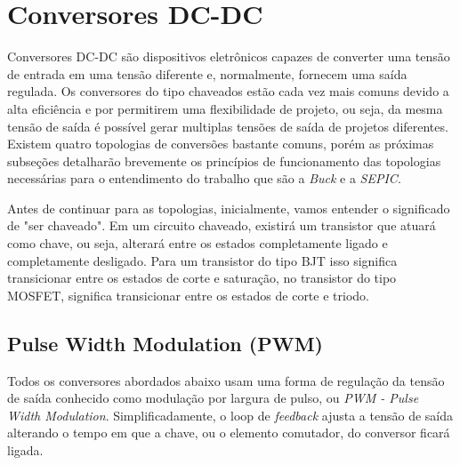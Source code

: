 \section{Conversores DC-DC}\label{converters_revision}
Conversores DC-DC \cite{ti_whitepaper}\cite{power_electronics_hart} são dispositivos eletrônicos capazes de converter uma tensão de entrada em uma tensão diferente e, normalmente, fornecem uma saída regulada. Os conversores do tipo chaveados estão cada vez mais comuns devido a alta eficiência e por permitirem uma flexibilidade de projeto, ou seja, da mesma tensão de saída é possível gerar multiplas tensões de saída de projetos diferentes. Existem quatro topologias de conversões bastante comuns, porém as próximas subseções detalharão brevemente os princípios de funcionamento das topologias necessárias para o entendimento do trabalho que são a \textit{Buck} e a \textit{SEPIC}.

Antes de continuar para as topologias, inicialmente, vamos entender o significado de "ser chaveado". Em um circuito chaveado, existirá um transistor que atuará como chave, ou seja, alterará entre os estados completamente ligado e completamente desligado. Para um transistor do tipo BJT isso significa transicionar entre os estados de corte e saturação, no transistor do tipo MOSFET, significa transicionar entre os estados de corte e triodo. 

\subsection*{Pulse Width Modulation (PWM)}
Todos os conversores abordados abaixo usam uma forma de regulação da tensão de saída conhecido como modulação por largura de pulso, ou \textit{PWM - Pulse Width Modulation}. Simplificadamente, o loop de \textit{feedback} ajusta a tensão de saída alterando o tempo em que a chave, ou o elemento comutador, do conversor ficará ligada.

\noindent
\begin{minipage}{\linewidth}
\label{PWM_sample_fig}
\end{minipage}


